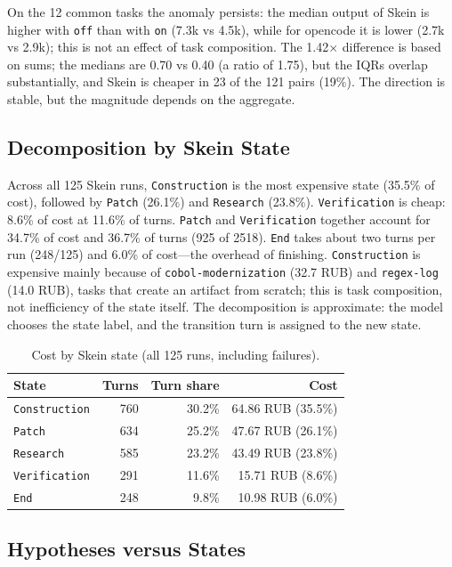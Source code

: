 \documentclass[11pt,a4paper]{article}
\begin{document}
On the 12 common tasks the anomaly persists: the median output of Skein is higher with
\texttt{off} than with \texttt{on} (7.3k vs 4.5k), while for opencode it is lower (2.7k vs
2.9k); this is not an effect of task composition. The 1.42$\times$ difference is based on sums; the
medians are 0.70 vs 0.40 (a ratio of 1.75), but the IQRs overlap substantially, and Skein is
cheaper in 23 of the 121 pairs (19\%). The direction is stable, but the magnitude depends on
the aggregate.

\subsection{Decomposition by Skein State}

Across all 125 Skein runs, \texttt{Construction} is the most expensive state (35.5\% of cost),
followed by \texttt{Patch} (26.1\%) and \texttt{Research} (23.8\%). \texttt{Verification} is
cheap: 8.6\% of cost at 11.6\% of turns. \texttt{Patch} and \texttt{Verification} together
account for 34.7\% of cost and 36.7\% of turns (925 of 2518). \texttt{End} takes about two turns
per run (248/125) and 6.0\% of cost---the overhead of finishing. \texttt{Construction} is
expensive mainly because of \texttt{cobol-modernization} (32.7 RUB) and
\texttt{regex-log} (14.0 RUB), tasks that create an artifact from scratch; this is task
composition, not inefficiency of the state itself. The decomposition is approximate: the model
chooses the state label, and the transition turn is assigned to the new state.

\begin{table}[t]
\centering
\small
\caption{Cost by Skein state (all 125 runs, including failures).}
\label{tab:state}
\begin{tabular}{@{}lrrr@{}}
\toprule
State & Turns & Turn share & Cost \\
\midrule
\texttt{Construction} & 760 & 30.2\% & 64.86 RUB (35.5\%) \\
\texttt{Patch} & 634 & 25.2\% & 47.67 RUB (26.1\%) \\
\texttt{Research} & 585 & 23.2\% & 43.49 RUB (23.8\%) \\
\texttt{Verification} & 291 & 11.6\% & 15.71 RUB (8.6\%) \\
\texttt{End} & 248 & 9.8\% & 10.98 RUB (6.0\%) \\
\bottomrule
\end{tabular}
\end{table}

\subsection{Hypotheses versus States}
\label{sec:hyp-exp}
\end{document}
